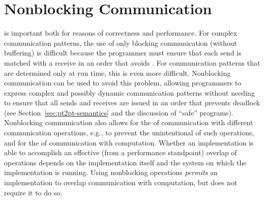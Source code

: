 \section{Nonblocking Communication}
\label{sec:pt2pt-nonblock}

is important both for reasons of correctness and performance.
For complex communication patterns, the use of only blocking communication
(without buffering) is difficult because the programmer must ensure that
each send is matched with a receive in an order that
avoids .
For communication patterns that are determined only at run time, this is even
more difficult.
Nonblocking communication can be used to avoid this problem, allowing programmers to
express complex and possibly dynamic communication patterns without needing to
ensure that all sends and receives are issued in an order that prevents
deadlock (see Section~\ref{sec:pt2pt-semantics} and the discussion of ``safe'' programs).
Nonblocking communication also allows for the 
of communication with different communication operations,
e.g., to prevent the unintentional  of such operations,
and for the 
of communication with computation.
Whether an implementation is able to accomplish an effective (from a
performance standpoint) overlap of operations depends on the implementation
itself and the system on which the implementation is running.
Using nonblocking operations \emph{permits} an implementation to overlap
communication with computation, but does not require it to do so.

